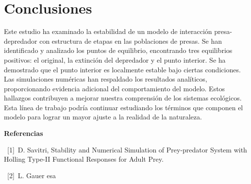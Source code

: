 \documentclass{wscpaperproc}
\theoremstyle{wsc}
\begin{document}
\section*{Conclusiones}

Este estudio ha examinado la estabilidad de un modelo de interacción presa-depredador con estructura
de etapas en las poblaciones de presas. Se han identificado y analizado los puntos de equilibrio,
encontrando tres equilibrios positivos: el original, la extinción del depredador y el punto interior.
Se ha demostrado que el punto interior es localmente estable bajo ciertas condiciones. Las simulaciones
numéricas han respaldado los resultados analíticos, proporcionando evidencia adicional del comportamiento
del modelo. Estos hallazgos contribuyen a mejorar nuestra comprensión de los sistemas ecológicos. Esta línea de trabajo
podría continuar estudiando los términos que componen el modelo para lograr un mayor ajuste a la realidad de la
naturaleza.


\vspace*{3cm}

{\bf \Large Referencias}

\ [1]\ {D. Savitri, Stability and Numerical Simulation of Prey-predator System with Holling
Type-II Functional Responses for Adult Prey}.

\ [2]\ {L. Gauer esa}
\end{document}
